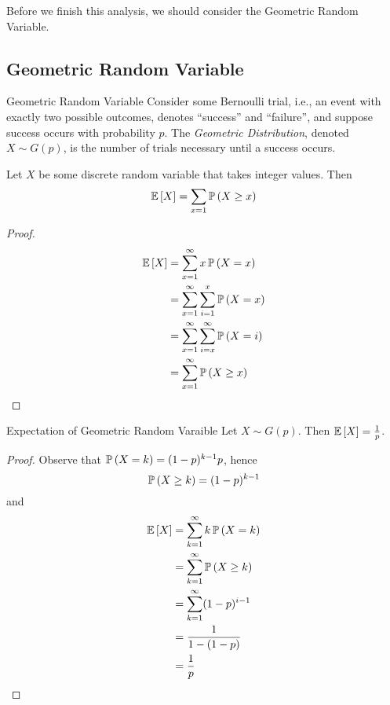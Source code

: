Before we finish this analysis, we should consider the Geometric Random
Variable.

\subsection{Geometric Random Variable}
\begin{definition}{Geometric Random Variable}{}
    Consider some Bernoulli trial, i.e., an event with exactly two possible
    outcomes, denotes ``success'' and ``failure'', and suppose success occurs
    with probability $p$. The \emph{Geometric Distribution}, denoted $X \sim
    G(p)$, is the number of trials necessary until a success occurs. 
\end{definition}

\begin{lemma}{}{}
    Let $X$ be some discrete random variable that takes integer values. Then
    \[\operatorname{\mathbb{E}}\left[X\right] = \sum_{x = 1} \operatorname{\mathbb{P}}\left(X \geq x\right)\]
\end{lemma}

\begin{proof}
    \begin{align*}\operatorname{\mathbb{E}}\left[X\right]
        &= \sum_{x=1}^{\infty}x \operatorname{\mathbb{P}}\left(X=x\right)\\
        &= \sum_{x=1}^{\infty}\sum_{i=1}^x \operatorname{\mathbb{P}}\left(X=x\right)\\
        &= \sum_{x=1}^{\infty}\sum_{i=x}^{\infty}\operatorname{\mathbb{P}}\left(X=i\right)\\
        &= \sum_{x=1}^{\infty}\operatorname{\mathbb{P}}\left(X \geq x\right)
    \end{align*}
\end{proof}

\begin{theorem}{Expectation of Geometric Random Varaible}{}
    Let $X \sim G(p)$. Then $\operatorname{\mathbb{E}}\left[X\right] = \frac{1}{p}$.
\end{theorem}

\begin{proof}
    Observe that $\operatorname{\mathbb{P}}\left(X = k\right) = (1 - p)^{k - 1}p$, hence
    \[\operatorname{\mathbb{P}}\left(X \geq k\right) = (1 - p)^{k - 1}\]
    and
    \begin{align*}\operatorname{\mathbb{E}}\left[X\right]
        &= \sum_{k=1}^{\infty} k\operatorname{\mathbb{P}}\left(X = k\right)\\
        &= \sum_{k=1}^{\infty} \operatorname{\mathbb{P}}\left(X \geq k\right)\\
        &= \sum_{k=1}^{\infty} (1 - p)^{i - 1}\\
        &= \frac{1}{1 - (1 - p)}\\
        &= \frac{1}{p}
    \end{align*}
\end{proof}


